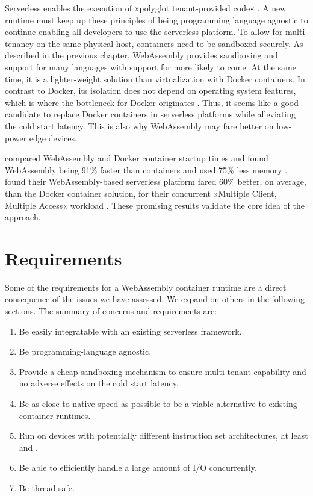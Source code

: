 Serverless enables the execution of »polyglot tenant-provided code« \cite{Nastic2018}. A new runtime must keep up these principles of being programming language agnostic to continue enabling all developers to use the serverless platform.
To allow for multi-tenancy on the same physical host, containers need to be sandboxed securely. As described in the previous chapter, WebAssembly provides sandboxing and support for many languages with support for more likely to come. At the same time, it is a lighter-weight solution than virtualization with Docker containers. In contrast to Docker, its isolation does not depend on operating system features, which is where the bottleneck for Docker originates \cite{Mohan2019}. Thus, it seems like a good candidate to replace Docker containers in serverless platforms while alleviating the cold start latency. This is also why WebAssembly may fare better on low-power edge devices.

\citeauthor{Mendki2020} compared WebAssembly and Docker container startup times and found WebAssembly being 91\% faster than containers and used 75\% less memory \cite{Mendki2020}. \citeauthor{Hall2019} found their WebAssembly-based serverless platform fared 60\% better, on average, than the Docker container solution, for their concurrent »Multiple Client, Multiple Access« workload \cite{Hall2019}. These promising results validate the core idea of the approach.

\section{Requirements}

Some of the requirements for a WebAssembly container runtime are a direct consequence of the issues we have assessed. We expand on others in the following sections. The summary of concerns and requirements are:

\begin{enumerate}
    \item Be easily integratable with an existing serverless framework.
    \item Be programming-language agnostic.
    \item Provide a cheap sandboxing mechanism to ensure multi-tenant capability and no adverse effects on the cold start latency.
    \item Be as close to native speed as possible to be a viable alternative to existing container runtimes.
    \item Run on devices with potentially different instruction set architectures, at least  and .
    \item Be able to efficiently handle a large amount of I/O concurrently.
    \item Be thread-safe.
\end{enumerate}

